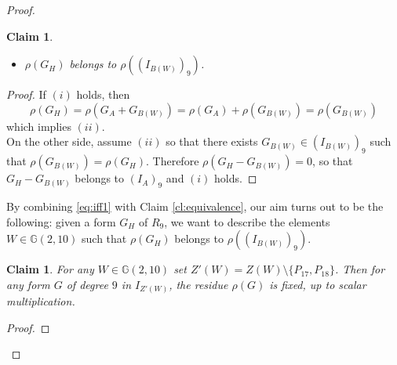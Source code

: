 \documentclass{amsart}
\newcommand{\G}{\mathbb{G}}
\newtheorem{claim0}[thm0]{Claim}
\theoremstyle{definition}
\begin{document}
\begin{proof}
\begin{claim0}
\begin{itemize}
\item[$(ii)$] $\rho(G_H)$ belongs to $\rho((I_{B(W)})_9)$. 
\end{itemize}
\end{claim0}
\begin{proof}
If $(i)$ holds, then
$$ \rho(G_H) = \rho(G_{A} + G_{B(W)}) =\rho(G_{A}) + \rho(G_{B(W)})= \rho(G_{B(W)}) $$ 
which implies $(ii)$. \\
On the other side, assume $(ii)$ so that there exists $G_{B(W)} \in (I_{B(W)})_9 $ such that $\rho(G_{B(W)})=\rho(G_H)$.
Therefore $\rho(G_H-G_{B(W)}) = 0$, so that $G_H-G_{B(W)}$ belongs to $(I_A)_9$  and $(i)$ holds. 
\end{proof}
\indent By combining \eqref{eq:iff1} with Claim \ref{cl:equivalence}, our aim turns out to be the following: given a form $ G_H$ of $R_9 $, we want 
to describe the elements $ W \in \G(2,10) $ such that $\rho(G_H)$ belongs to $\rho((I_{B(W)})_9)$. 

\begin{claim0}\label{resZ'}
For any $ W \in \G(2,10) $ set $Z'(W)=Z(W)\setminus \{P_{17},P_{18}\}$. Then for any form $G$ of degree $9$ in $I_{Z'(W)}$, the residue $\rho(G)$
is fixed, up to scalar multiplication.
\end{claim0}
\begin{proof}


\end{proof}
\end{proof}
\end{document}
